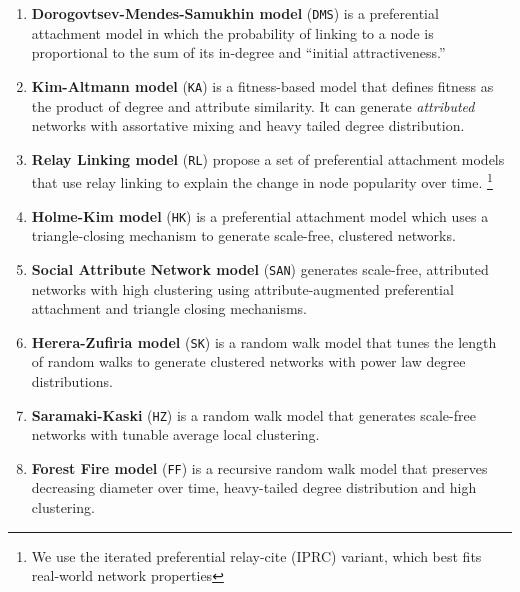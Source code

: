 \begin{enumerate}
	\item{\textbf{Dorogovtsev-Mendes-Samukhin model}} \cite{dorogovtsev2000structure}  (\texttt{DMS})
	is a preferential attachment model in which the probability of linking to a node is proportional
	to the sum of its in-degree and ``initial attractiveness.''
			
	\item{\textbf{Kim-Altmann model}} \cite{kim2017effect} (\texttt{KA}) is a fitness-based model that defines
	fitness as the product of degree and attribute similarity. It can generate \textit{attributed} networks with assortative mixing and
	heavy tailed degree distribution.
			
	\item{\textbf{Relay Linking model}} \cite{singh2017relay} (\texttt{RL}) propose a set of
	preferential attachment models that use relay linking to explain the change in node popularity over time.
	\footnote{We use the iterated preferential relay-cite (IPRC) variant, which best fits real-world network properties}
			
	\item{\textbf{Holme-Kim model}} \cite{holme2002growing} (\texttt{HK}) is a preferential attachment model
	which uses a triangle-closing mechanism to generate scale-free, clustered networks.
			
	\item{\textbf{Social Attribute Network model}} \cite{gong2012evolution} (\texttt{SAN}) generates
	scale-free, attributed networks with high clustering using attribute-augmented
	preferential attachment and triangle closing mechanisms.
			
			
	\item{\textbf{Herera-Zufiria model}} \cite{saramaki2004scale} (\texttt{SK})  is a random walk model
	that tunes the length of random walks to generate clustered networks with power law degree distributions.
			
	\item{\textbf{Saramaki-Kaski}} \cite{herrera2011generating} (\texttt{HZ}) is a random walk model
	that generates scale-free networks with tunable average local clustering.
			
	\item{\textbf{Forest Fire model}} \cite{leskovec2005graphs} (\texttt{FF}) is a recursive random walk model
	that preserves decreasing diameter over time, heavy-tailed degree distribution
	and high clustering.
\end{enumerate}

